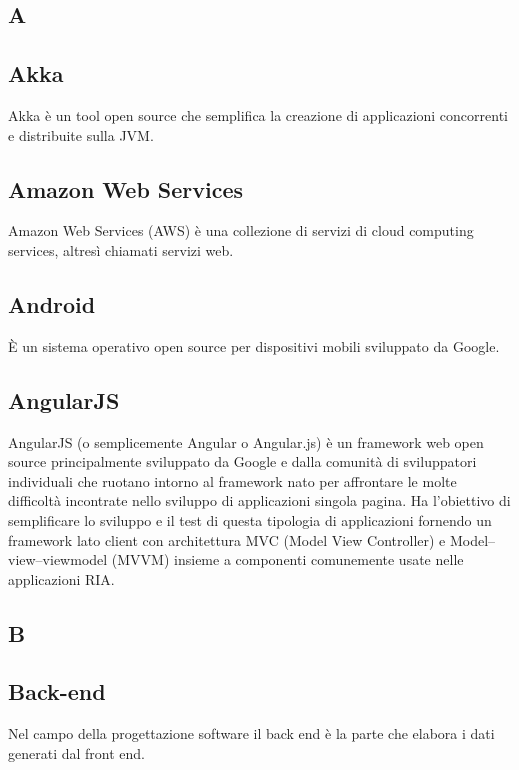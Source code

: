 \newpage

\begin{center}
\Huge\section*{\uppercase{A}}
\end{center}

\subsection*{Akka}
Akka è un tool open source che semplifica la creazione di applicazioni concorrenti e distribuite sulla JVM.

\subsection*{Amazon Web Services}
Amazon Web Services (AWS) è una collezione di servizi di cloud computing services, altresì chiamati servizi web.

\subsection*{Android}
È un sistema operativo open source per dispositivi mobili sviluppato da Google.

\subsection*{AngularJS}
AngularJS (o semplicemente Angular o Angular.js) è un framework web open source principalmente sviluppato da Google e dalla comunità di sviluppatori individuali che ruotano intorno al framework nato per affrontare le molte difficoltà incontrate nello sviluppo di applicazioni singola pagina. Ha l'obiettivo di semplificare lo sviluppo e il test di questa tipologia di applicazioni fornendo un framework lato client con architettura MVC (Model View Controller) e Model–view–viewmodel (MVVM) insieme a componenti comunemente usate nelle applicazioni RIA.

\newpage

\begin{center}
\Huge\section*{\uppercase{B}}
\end{center}

\subsection*{Back-end}
Nel campo della progettazione software il back end è la parte che elabora i dati generati dal front end.

